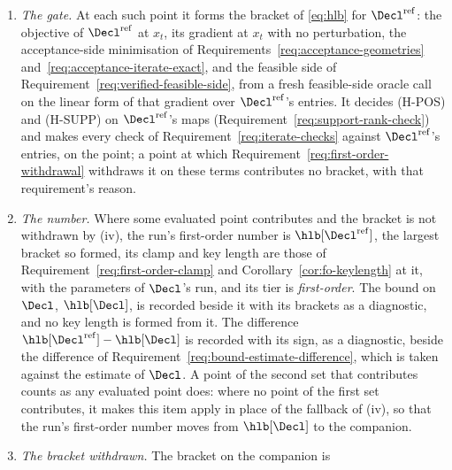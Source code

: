 \begin{requirement}
\begin{enumerate}[label=(\roman*),leftmargin=2.4em]
  fallback of Requirement~\ref{req:certified-evaluation}\,(i), and on the
  soundness of none of them. Its objective values are not the run's
  : none is reported, and none refuses the run
  (Requirement~\ref{req:negative-estimate-refused} reads the estimate of the
  search on $\Decl$ alone).
  Each point $x_t=(\mathbf q_t,J_t)$ of either set is taken as the search
  or the polish consumed it, $\mathbf q_t$ included, and is a point of the
  Choi program of $\Decl^{\mathrm{ref}}$
  (Corollary~\ref{cor:fo-reference}\,(ii)).
\item \emph{The gate.} At each such point it forms the bracket of
  \eqref{eq:hlb} for $\Decl^{\mathrm{ref}}$: the objective of
  $\Decl^{\mathrm{ref}}$ at $x_t$, its gradient at $x_t$ with no
  perturbation, the acceptance-side minimisation of
  Requirements~\ref{req:acceptance-geometries}
  and~\ref{req:acceptance-iterate-exact}, and the feasible side of
  Requirement~\ref{req:verified-feasible-side}, from a fresh feasible-side
  oracle call on the linear form of that gradient over
  $\Decl^{\mathrm{ref}}$'s entries. It decides (H-POS) and (H-SUPP) on
  $\Decl^{\mathrm{ref}}$'s maps (Requirement~\ref{req:support-rank-check})
  and makes every check of Requirement~\ref{req:iterate-checks} against
  $\Decl^{\mathrm{ref}}$'s entries, on the point; a point at which
  Requirement~\ref{req:first-order-withdrawal} withdraws it on these terms
  contributes no bracket, with that requirement's reason.
\item \emph{The number.} Where some evaluated point contributes and the
  bracket is not withdrawn by (iv), the run's
  first-order number is $\hlb[\Decl^{\mathrm{ref}}]$, the largest bracket so
  formed, its clamp and key length are those of
  Requirement~\ref{req:first-order-clamp} and
  Corollary~\ref{cor:fo-keylength} at it, with the parameters of $\Decl$'s
  run, and its tier is \emph{first-order}. The bound on $\Decl$,
  $\hlb[\Decl]$, is recorded beside it with its brackets as a diagnostic,
  and no key length is formed from it. The difference
  $\hlb[\Decl^{\mathrm{ref}}]-\hlb[\Decl]$ is recorded with its sign, as a
  diagnostic, beside the difference of
  Requirement~\ref{req:bound-estimate-difference}, which is taken against
  the estimate of $\Decl$. A point of the second set that contributes
  counts as any evaluated point does: where no point of the first set
  contributes, it makes this item apply in place of the fallback of (iv),
  so that the run's first-order number moves from $\hlb[\Decl]$ to the
  companion.
\item \emph{The bracket withdrawn.} The bracket on the companion is

\end{enumerate}
\end{requirement}
